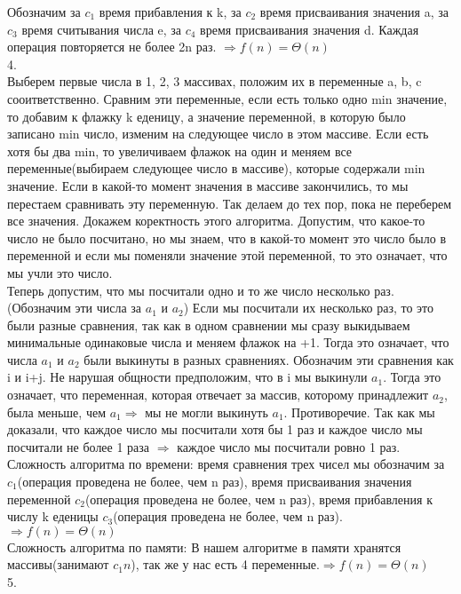 \documentclass[a4paper,12pt]{article}
\begin{document}
Обозначим за $c_1$ время прибавления к k, за $c_2$ время присваивания значения a, за $c_3$ время считывания числа e, за $c_4$ время присваивания значения d. Каждая операция повторяется не более 2n раз. $\Rightarrow  f(n)=\Theta(n)$\\
4.\\
Выберем первые числа в 1, 2,  3 массивах, положим их в переменные a, b, c  сооитветственно. Сравним эти переменные, если есть только одно min значение, то добавим к флажку k еденицу, а значение переменной, в которую было записано min число, изменим на следующее число в этом массиве. Если есть хотя бы два min, то увеличиваем флажок на один и меняем все переменные(выбираем следующее число в массиве), которые содержали min значение. Если в какой-то момент значения в массиве закончились, то мы перестаем сравнивать эту переменную. Так делаем до тех пор, пока не переберем все значения.
Докажем коректность этого алгоритма. Допустим, что какое-то число не было посчитано, но мы знаем, что в какой-то момент это число было в переменной и если мы поменяли значение этой переменной, то это означает, что мы учли это число. \\
Теперь допустим, что мы посчитали одно и то же число несколько раз.(Обозначим эти числа за $a_1$ и $a_2$) Если мы посчитали их несколько раз, то это были разные сравнения, так как в одном сравнении мы сразу выкидываем минимальные одинаковые числа и меняем флажок на +1. Тогда это означает, что числа $a_1$ и $a_2$ были выкинуты в разных сравнениях. Обозначим эти сравнения как i и i+j. Не нарушая общности предположим, что в i мы выкинули $a_1$. Тогда это означает, что переменная, которая отвечает за массив, которому принадлежит $a_2$, была меньше, чем $a_1 \Rightarrow$ мы не могли выкинуть $a_1$. Противоречие. Так как мы доказали, что  каждое число мы посчитали хотя бы 1 раз и каждое число мы посчитали не более 1 раза $\Rightarrow$ каждое число мы посчитали ровно 1 раз.\\
Сложность алгоритма по времени: время сравнения трех чисел мы обозначим за $c_1$(операция проведена не более, чем n раз), время присваивания значения переменной $c_2$(операция проведена не более, чем n раз), время прибавления к числу k еденицы $c_3$(операция проведена не более, чем n раз). $\Rightarrow  f(n)=\Theta(n)$\\
Сложность алгоритма по памяти: В нашем алгоритме в памяти хранятся массивы(занимают  $c_1 n$), так же у нас есть 4 переменные.$\Rightarrow  f(n)=\Theta(n)$\\
5.\\
\end{document}
